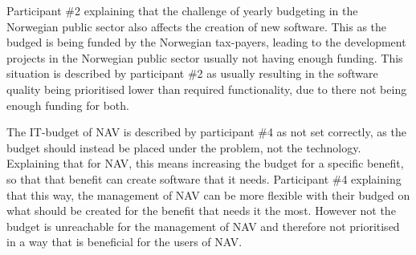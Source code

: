 
Participant \#2 explaining that the challenge of yearly budgeting in the Norwegian public sector also affects the creation of new software. This as the budged is being funded by the Norwegian tax-payers, leading to the development projects in the Norwegian public sector usually not having enough funding. This situation is described by participant \#2 as usually resulting in the software quality being prioritised lower than required functionality, due to there not being enough funding for both.


The IT-budget of NAV is described by participant \#4 as not set correctly, as the budget should instead be placed under the problem, not the technology. Explaining that for NAV, this means increasing the budget for a specific benefit, so that that benefit can create software that it needs. Participant \#4 explaining that this way, the management of NAV can be more flexible with their budged on what should be created for the benefit that needs it the most. However not the budget is unreachable for the management of NAV and therefore not prioritised in a way that is beneficial for the users of NAV.


